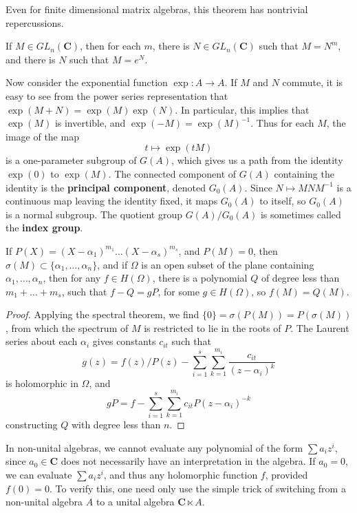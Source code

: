 Even for finite dimensional matrix algebras, this theorem has nontrivial repercussions.

\begin{corollary}
    If $M \in GL_n(\mathbf{C})$, then for each $m$, there is $N \in GL_n(\mathbf{C})$ such that $M = N^m$, and there is $N$ such that $M = e^N$.
\end{corollary}

\begin{example}
    Now consider the exponential function $\exp: A \to A$. If $M$ and $N$ commute, it is easy to see from the power series representation that $\exp(M + N) = \exp(M) \exp(N)$. In particular, this implies that $\exp(M)$ is invertible, and $\exp(-M) = \exp(M)^{-1}$. Thus for each $M$, the image of the map
    \[ t \mapsto \exp(tM) \]
    is a one-parameter subgroup of $G(A)$, which gives us a path from the identity $\exp(0)$ to $\exp(M)$. The connected component of $G(A)$ containing the identity is the {\bf principal component}, denoted $G_0(A)$. Since $N \mapsto MNM^{-1}$ is a continuous map leaving the identity fixed, it maps $G_0(A)$ to itself, so $G_0(A)$ is a normal subgroup. The quotient group $G(A)/G_0(A)$ is sometimes called the {\bf index group}.
\end{example}

\begin{theorem}
    If $P(X) = (X - \alpha_1)^{m_1} \dots (X - \alpha_s)^{m_s}$, and $P(M) = 0$, then $\sigma(M) \subset \{ \alpha_1, \dots, \alpha_n \}$, and if $\Omega$ is an open subset of the plane containing $\alpha_1, \dots, \alpha_n$, then for any $f \in H(\Omega)$, there is a polynomial $Q$ of degree less than $m_1 + \dots + m_s$, such that $f - Q = gP$, for some $g \in H(\Omega)$, so $f(M) = Q(M)$.
\end{theorem}
\begin{proof}
    Applying the spectral theorem, we find $\{ 0 \} = \sigma(P(M)) = P(\sigma(M))$, from which the spectrum of $M$ is restricted to lie in the roots of $P$. The Laurent series about each $\alpha_i$ gives constants $c_{it}$ such that
    \[ g(z) = f(z)/P(z) - \sum_{i = 1}^s \sum_{k = 1}^{m_i} \frac{c_{it}}{(z - \alpha_i)^k} \]
    is holomorphic in $\Omega$, and
    \[ gP = f - \sum_{i = 1}^s \sum_{k = 1}^{m_i} c_{it} P (z - \alpha_i)^{-k} \]
    constructing $Q$ with degree less than $n$.
\end{proof}

In non-unital algebras, we cannot evaluate any polynomial of the form $\sum a_i z^i$, since $a_0 \in \mathbf{C}$ does not necessarily have an interpretation in the algebra. If $a_0 = 0$, we can evaluate $\sum a_i z^i$, and thus any holomorphic function $f$, provided $f(0) = 0$. To verify this, one need only use the simple trick of switching from a non-unital algebra $A$ to a unital algebra $\mathbf{C} \ltimes A$.






